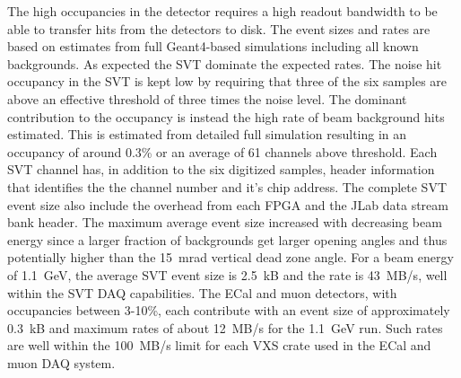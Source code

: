The high occupancies in the detector requires a high readout bandwidth to be able to transfer hits from the 
detectors to disk. The event sizes and rates are based on estimates from full Geant4-based simulations 
including all known backgrounds. As expected the SVT dominate the expected rates. 
The noise hit occupancy in the SVT is kept low by requiring that three of the six samples are above an
effective threshold of three times the noise level. The dominant contribution to the occupancy is instead 
the high rate of beam background hits estimated. This is estimated 
from detailed full simulation resulting in an occupancy of around 0.3\% or an average of 61 channels above threshold.  
Each SVT channel has, in addition to the six digitized samples,  header information that identifies the 
the channel number and it's chip address. The complete SVT event size also 
include the overhead from each FPGA and the JLab data stream bank header.  
The maximum average event size increased with decreasing beam energy since a larger 
fraction of backgrounds get larger opening angles and thus potentially higher than the 15~mrad 
vertical dead zone angle. For a beam energy of 1.1~GeV, the average SVT event size is 2.5~kB and 
the rate is 43~MB/s, well within the SVT DAQ capabilities. 
The ECal and muon detectors, with occupancies between 3-10\%, each contribute with an event size of 
approximately 0.3~kB and maximum rates of about 12~MB/s for the 1.1~GeV run. 
 Such rates are well within the 100~MB/s limit for each VXS crate used in the ECal and muon 
DAQ system.
